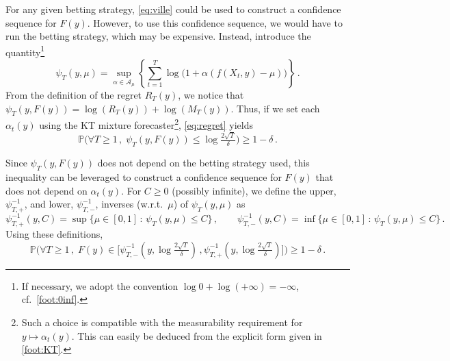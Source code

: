 \documentclass[3p, authoryear, 10pt]{elsarticle}%
\begin{document}
For any given betting strategy, \eqref{eq:ville} could be used to construct a confidence sequence for $F(y)$. However, to use this confidence sequence, we would have to run the betting strategy, which may be expensive. Instead, \citet{orabona2023tight} introduce the quantity\footnote{If necessary, we adopt the convention $\log 0 + \log(+\infty) = -\infty$, cf.\ \cref{foot:0inf}.}
\begin{equation*}
\psi_T(y, \mu) = \sup_{\alpha \in \mathcal{A}_{\mu}}\left\{\sum_{t=1}^{T}\log\big(1 + \alpha(f(X_t, y) - \mu)\big)\right\}\,.
\end{equation*}
From the definition of the regret $R_T(y)$, we notice that $\psi_T(y, F(y)) = \log(R_T(y)) + \log(M_T(y))$. Thus, if we set each $\alpha_t(y)$ using the KT mixture forecaster\footnote{Such a choice is compatible with the measurability requirement for $y\mapsto\alpha_t(y)$. This can easily be deduced from the explicit form given in \cref{foot:KT}.}, \eqref{eq:regret} yields
\begin{equation}
\mathbb{P}\Big(\forall T \geq 1\,,\;\psi_T(y, F(y)) \leq \log\tfrac{2\sqrt{T}}{\delta}\Big) \geq 1 - \delta\,.\label{eq:psi_ineq}
\end{equation}

Since $\psi_T(y, F(y))$ does not depend on the betting strategy used, this inequality can be leveraged to construct a confidence sequence for $F(y)$ that does not depend on $\alpha_t(y)$. For $C\geq 0$ (possibly infinite), we define the upper, $\psi_{T,+}^{-1}$, and lower, $\psi_{T,-}^{-1}$, inverses (w.r.t.\ $\mu$) of $\psi_T(y, \mu)$ as
\begin{equation}\label{eq:psinv}
\psi_{T, +}^{-1}(y, C) = \sup\big\{\mu\in[0,1]\,:\,\psi_{T}(y, \mu)\leq C\big\}\,, \qquad \psi_{T, -}^{-1}(y, C) = \inf\big\{\mu\in[0,1]\,:\,\psi_{T}(y, \mu)\leq C\big\}\,.
\end{equation}
Using these definitions,
\begin{equation*}
\mathbb{P}\Big(\forall T \geq 1\,,\;F(y) \in \big[\psi_{T, -}^{-1}(y, \log\tfrac{2\sqrt{T}}{\delta})\,, \psi_{T, +}^{-1}(y, \log\tfrac{2\sqrt{T}}{\delta})\big]\Big) \geq 1 - \delta\,.
\end{equation*}
\end{document}
